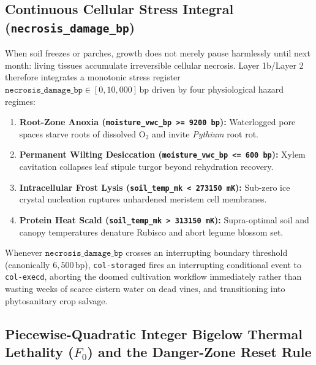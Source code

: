 \subsection{Continuous Cellular Stress Integral (\texttt{necrosis\_damage\_bp})}

When soil freezes or parches, growth does not merely pause harmlessly until next month: living
tissues accumulate irreversible cellular necrosis. Layer 1b/Layer 2 therefore integrates a
monotonic stress register $\texttt{necrosis\_damage\_bp} \in [0, 10{,}000]\,\mathrm{bp}$ driven
by four physiological hazard regimes:

\begin{enumerate}
    \item \textbf{Root-Zone Anoxia (\texttt{moisture\_vwc\_bp >= 9200 bp}):} Waterlogged pore
    spaces starve roots of dissolved $\mathrm{O_2}$ and invite \emph{Pythium} root rot.
    \item \textbf{Permanent Wilting Desiccation (\texttt{moisture\_vwc\_bp <= 600 bp}):} Xylem
    cavitation collapses leaf stipule turgor beyond rehydration recovery.
    \item \textbf{Intracellular Frost Lysis (\texttt{soil\_temp\_mk < 273150 mK}):} Sub-zero ice
    crystal nucleation ruptures unhardened meristem cell membranes.
    \item \textbf{Protein Heat Scald (\texttt{soil\_temp\_mk > 313150 mK}):} Supra-optimal soil
    and canopy temperatures denature Rubisco and abort legume blossom set.
\end{enumerate}

Whenever $\texttt{necrosis\_damage\_bp}$ crosses an interrupting boundary threshold (canonically
$6{,}500\,\mathrm{bp}$), \texttt{col-storaged} fires an interrupting conditional event to
\texttt{col-execd}, aborting the doomed cultivation workflow immediately rather than wasting
weeks of scarce cistern water on dead vines, and transitioning into phytosanitary crop salvage.

\subsection{Piecewise-Quadratic Integer Bigelow Thermal Lethality ($F_0$) and the Danger-Zone Reset Rule}

